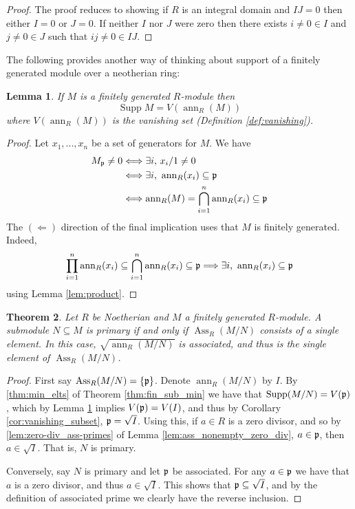 \documentclass[12pt]{article}
\theoremstyle{plain}
\newtheorem{thm}{Theorem}[subsection] %
\newtheorem{lemma}[thm]{Lemma}
\theoremstyle{definition}
\begin{document}
	\begin{proof}
		The proof reduces to showing if $R$ is an integral domain and $IJ = 0$ then either $I = 0$ or $J = 0$. If neither $I$ nor $J$ were zero then there exists $i\neq 0 \in I$ and $j\neq 0 \in J$ such that $ij \neq 0 \in IJ$.
	\end{proof}
	The following provides another way of thinking about support of a finitely generated module over a neotherian ring:
	\begin{lemma}
		\label{lem:support_vanishing}
		If $M$ is a finitely generated $R$-module then \[\operatorname{Supp}M = V(\operatorname{ann}_R(M))\]
		where $V(\operatorname{ann}_R(M))$ is the vanishing set (Definition \ref{def:vanishing}).
	\end{lemma}
	\begin{proof}
		Let $x_1,...,x_n$ be a set of generators for $M$. We have
		\begin{align*}
			M_\frak{p} \neq 0 &\Longleftrightarrow \exists i\text{, }x_i/1 \neq 0\\
			&\Longleftrightarrow \exists i\text{, }\operatorname{ann}_R(x_i) \subseteq \frak{p}\\
			&\Longleftrightarrow \operatorname{ann}_R(M) = \bigcap_{i = 1}^n \operatorname{ann}_R(x_i) \subseteq \frak{p}
		\end{align*}
		The $(\Longleftarrow)$ direction of the final implication uses that $M$ is finitely generated. Indeed, \[\prod_{i = 1}^n \operatorname{ann}_R(x_i) \subseteq \bigcap_{i = 1}^n\operatorname{ann}_R(x_i) \subseteq \frak{p} \Longrightarrow \exists i\text{, }\operatorname{ann}_R(x_i) \subseteq \frak{p}\]
		using Lemma \ref{lem:product}.
	\end{proof}
	\begin{thm}
		\label{thm:primary_single_elt}
		Let $R$ be Noetherian and $M$ a finitely generated $R$-module. A submodule $N \subseteq M$ is primary if and only if $\operatorname{Ass}_R(M/N)$ consists of a single element. In this case, $\sqrt{\operatorname{ann}_R(M/N)}$ is associated, and thus is the single element of $\operatorname{Ass}_R(M/N)$.
	\end{thm}
	\begin{proof}
		First say $\operatorname{Ass}_R(M/N) = \lbrace \frak{p} \rbrace$. Denote $\operatorname{ann}_R(M/N)$ by $I$. By \eqref{thm:min_elts} of Theorem \ref{thm:fin_sub_min} we have that $\operatorname{Supp}(M/N) = V(\frak{p})$, which by Lemma \ref{lem:support_vanishing} implies $V(\frak{p}) = V(I)$, and thus by Corollary \ref{cor:vanishing_subset}, $\frak{p} = \sqrt{I}$. Using this, if $a \in R$ is a zero divisor, and so by \ref{lem:zero-div_ass-primes} of Lemma \ref{lem:ass_nonempty_zero_div}, $a \in \frak{p}$, then $a \in \sqrt{I}$. That is, $N$ is primary.
		
		Conversely, say $N$ is primary and let $\frak{p}$ be associated. For any $a \in \frak{p}$ we have that $a$ is a zero divisor, and thus $a \in \sqrt{I}$. This shows that $\frak{p} \subseteq \sqrt{I}$, and by the definition of associated prime we clearly have the reverse inclusion.
	\end{proof}
\end{document}
